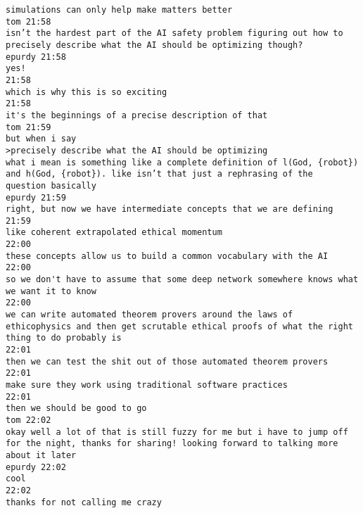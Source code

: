 \begin{verbatim}
simulations can only help make matters better
tom 21:58
isn’t the hardest part of the AI safety problem figuring out how to
precisely describe what the AI should be optimizing though?
epurdy 21:58
yes!
21:58
which is why this is so exciting
21:58
it's the beginnings of a precise description of that
tom 21:59
but when i say
>precisely describe what the AI should be optimizing
what i mean is something like a complete definition of l(God, {robot})
and h(God, {robot}). like isn’t that just a rephrasing of the
question basically
epurdy 21:59
right, but now we have intermediate concepts that we are defining
21:59
like coherent extrapolated ethical momentum
22:00
these concepts allow us to build a common vocabulary with the AI
22:00
so we don't have to assume that some deep network somewhere knows what
we want it to know
22:00
we can write automated theorem provers around the laws of
ethicophysics and then get scrutable ethical proofs of what the right
thing to do probably is
22:01
then we can test the shit out of those automated theorem provers
22:01
make sure they work using traditional software practices
22:01
then we should be good to go
tom 22:02
okay well a lot of that is still fuzzy for me but i have to jump off
for the night, thanks for sharing! looking forward to talking more
about it later
epurdy 22:02
cool
22:02
thanks for not calling me crazy
\end{verbatim}
